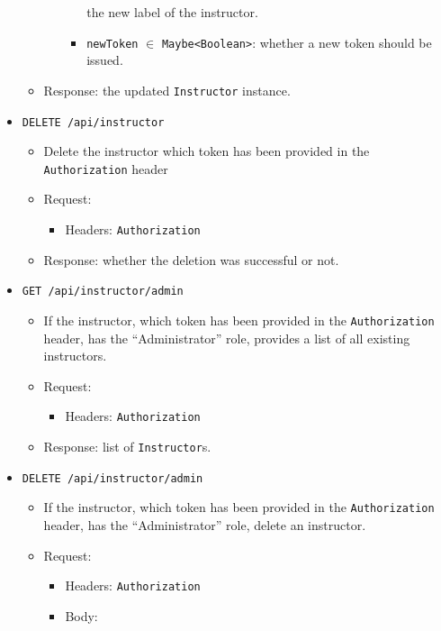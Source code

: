 \begin{chapterBody}
\begin{itemize}
\begin{itemize}
\begin{itemize}
\begin{itemize}
the new label of the instructor.
                \item \texttt{newToken} $ \in $ \texttt{Maybe<Boolean>}:
whether a new token should be issued.
            \end{itemize}
        \end{itemize}
        \item Response: the updated \texttt{Instructor} instance.
    \end{itemize}
    \item \texttt{DELETE /api/instructor}
    \begin{itemize}
        \item Delete the instructor which token has been provided in the
\texttt{Authorization} header
        \item Request:
        \begin{itemize}
            \item Headers: \texttt{Authorization}
        \end{itemize}
        \item Response: whether the deletion was successful or not.
    \end{itemize}
    \item \texttt{GET /api/instructor/admin}
    \begin{itemize}
        \item If the instructor, which token has been provided in the
\texttt{Authorization} header, has the ``Administrator'' role,
provides a list of all existing instructors.
        \item Request:
        \begin{itemize}
            \item Headers: \texttt{Authorization}
        \end{itemize}
        \item Response: list of \texttt{Instructor}s.
    \end{itemize}
    \item \texttt{DELETE /api/instructor/admin}
    \begin{itemize}
        \item If the instructor, which token has been provided in the
\texttt{Authorization} header, has the ``Administrator'' role,  delete an
instructor.
        \item Request:
        \begin{itemize}
            \item Headers: \texttt{Authorization}
            \item Body:

\end{itemize}
\end{itemize}
\end{itemize}
\end{chapterBody}

